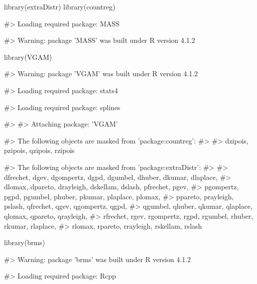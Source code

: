 \begin{Schunk}
\begin{Sinput}
library(extraDistr)
library(countreg)
\end{Sinput}
\begin{Soutput}
#> Loading required package: MASS
\end{Soutput}
\begin{Soutput}
#> Warning: package 'MASS' was built under R version 4.1.2
\end{Soutput}
\begin{Sinput}
library(VGAM)
\end{Sinput}
\begin{Soutput}
#> Warning: package 'VGAM' was built under R version 4.1.2
\end{Soutput}
\begin{Soutput}
#> Loading required package: stats4
\end{Soutput}
\begin{Soutput}
#> Loading required package: splines
\end{Soutput}
\begin{Soutput}
#> 
#> Attaching package: 'VGAM'
\end{Soutput}
\begin{Soutput}
#> The following objects are masked from 'package:countreg':
#> 
#>     dzipois, pzipois, qzipois, rzipois
\end{Soutput}
\begin{Soutput}
#> The following objects are masked from 'package:extraDistr':
#> 
#>     dfrechet, dgev, dgompertz, dgpd, dgumbel, dhuber, dkumar, dlaplace,
#>     dlomax, dpareto, drayleigh, dskellam, dslash, pfrechet, pgev,
#>     pgompertz, pgpd, pgumbel, phuber, pkumar, plaplace, plomax,
#>     ppareto, prayleigh, pslash, qfrechet, qgev, qgompertz, qgpd,
#>     qgumbel, qhuber, qkumar, qlaplace, qlomax, qpareto, qrayleigh,
#>     rfrechet, rgev, rgompertz, rgpd, rgumbel, rhuber, rkumar, rlaplace,
#>     rlomax, rpareto, rrayleigh, rskellam, rslash
\end{Soutput}
\begin{Sinput}
library(brms)
\end{Sinput}
\begin{Soutput}
#> Warning: package 'brms' was built under R version 4.1.2
\end{Soutput}
\begin{Soutput}
#> Loading required package: Rcpp
\end{Soutput}
\begin{Soutput}

\end{Soutput}
\end{Schunk}
